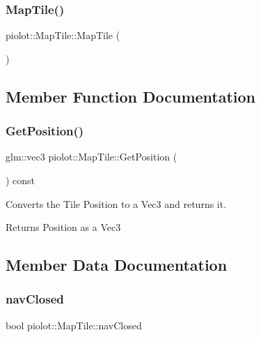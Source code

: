 \subsubsection{\texorpdfstring{Map\+Tile()}{MapTile()}}
{\footnotesize\ttfamily piolot\+::\+Map\+Tile\+::\+Map\+Tile (\begin{DoxyParamCaption}{ }\end{DoxyParamCaption})\hspace{0.3cm}{\ttfamily [default]}}



\subsection{Member Function Documentation}
\mbox{\label{classpiolot_1_1_map_tile_a7c9e9f16474de4e82689811afc1ac123}} 
\subsubsection{\texorpdfstring{Get\+Position()}{GetPosition()}}
{\footnotesize\ttfamily glm\+::vec3 piolot\+::\+Map\+Tile\+::\+Get\+Position (\begin{DoxyParamCaption}{ }\end{DoxyParamCaption}) const}



Converts the Tile Position to a Vec3 and returns it. 

\begin{DoxyReturn}{Returns}
Position as a Vec3 
\end{DoxyReturn}


\subsection{Member Data Documentation}
\mbox{\label{classpiolot_1_1_map_tile_a272716e88eca5a971db3a3f9ea2ccf47}} 
\subsubsection{\texorpdfstring{nav\+Closed}{navClosed}}
{\footnotesize\ttfamily bool piolot\+::\+Map\+Tile\+::nav\+Closed}



